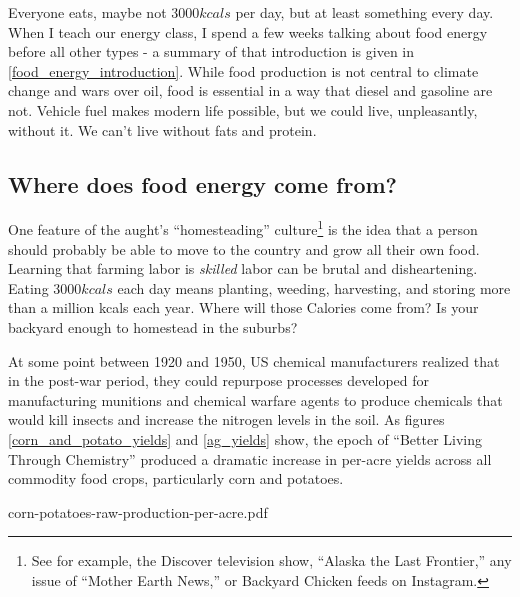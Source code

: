 \documentclass[onecolumn]{article}
\begin{document}
Everyone eats, maybe not $3000 kcals$ per day, but at least something every day.  When I teach our energy class, I spend a few weeks talking about food energy before all other types - a summary of that introduction is given in \ref{food_energy_introduction}.  
While food production is not central to climate change and wars over oil, food is essential in a way that diesel and gasoline are not.  
Vehicle fuel makes modern life possible, but we could live, unpleasantly, without it.  
We can't live without fats and protein.  

\subsection{Where does food energy come from?}
One feature of the aught's ``homesteading'' culture\footnote{
See for example, the Discover television show, ``Alaska the Last Frontier,'' any issue of ``Mother Earth News,'' or Backyard Chicken feeds on Instagram.  
}
is the idea that a person should probably be able to move to the country and grow all their own food.  Learning that farming labor is \textit{skilled} labor can be brutal and disheartening. Eating $3000kcals$ each day means planting, weeding, harvesting, and storing more than a million kcals each year. \cite{Haspel}
Where will those Calories come from? Is your backyard enough to homestead in the suburbs?\cite{backyard_homestead}

At some point between 1920 and 1950, US chemical manufacturers realized that in the post-war period, they could repurpose processes developed for manufacturing munitions and chemical warfare agents to produce chemicals that would kill insects and increase the nitrogen levels in the soil. As figures \ref{corn_and_potato_yields} and \ref{ag_yields} show, the epoch of ``Better Living Through Chemistry'' produced a dramatic increase in per-acre yields across all commodity food crops, particularly corn and potatoes.  

corn-potatoes-raw-production-per-acre.pdf
\end{document}
